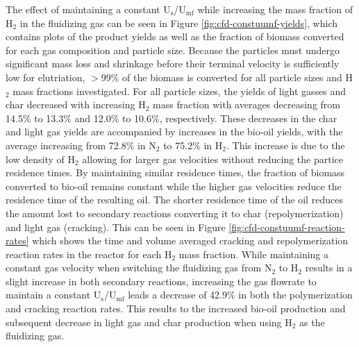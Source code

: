 The effect of maintaining a constant U$_\text{s}$/U$_\text{mf}$ while increasing the mass fraction of H$_2$ in the fluidizing gas can be seen in Figure \ref{fig:cfd-constuumf-yields}, which contains plots of the product yields as well as the fraction of biomass converted for each gas composition and particle size. Because the particles must undergo significant mass loss and shrinkage before their terminal velocity is sufficiently low for elutriation, $>$99\% of the biomass is converted for all particle sizes and H$_2$ mass fractions investigated. For all particle sizes, the yields of light gasses and char decreased with increasing H$_2$ mass fraction with averages decreasing from 14.5\% to 13.3\% and 12.0\% to 10.6\%, respectively. These decreases in the char and light gas yields are accompanied by increases in the bio-oil yields, with the average increasing from 72.8\% in N$_2$ to 75.2\% in H$_2$. This increase is due to the low density of H$_2$ allowing for larger gas velocities without reducing the partice residence times. By maintaining similar residence times, the fraction of biomass converted to bio-oil remains constant while the higher gas velocities reduce the residence time of the resulting oil. The shorter residence time of the oil reduces the amount lost to secondary reactions converting it to char (repolymerization) and light gas (cracking). This can be seen in Figure \ref{fig:cfd-constuumf-reaction-rates} which shows the time and volume averaged cracking and repolymerization reaction rates in the reactor for each H$_2$ mass fraction. While maintaining a constant gas velocity when switching the fluidizing gas from N$_2$ to H$_2$ results in a slight increase in both secondary reactions, increasing the gas flowrate to maintain a constant U$_\text{s}$/U$_\text{mf}$ leads a decrease of 42.9\% in both the polymerization and cracking reaction rates. This results to the increased bio-oil production and subsequent decrease in light gas and char production when using H$_2$ as the fluidizing gas.

